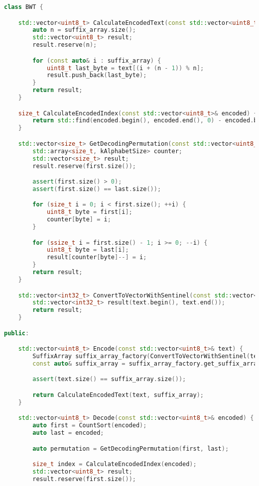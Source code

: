 \begin{lstlisting}[language=C++]
class BWT {

    std::vector<uint8_t> CalculateEncodedText(const std::vector<uint8_t>& text, const std::vector<std::size_t>& suffix_array) {
        auto n = suffix_array.size();
        std::vector<uint8_t> result;
        result.reserve(n);

        for (const auto& i : suffix_array) {
            uint8_t last_byte = text[(i + (n - 1)) % n];
            result.push_back(last_byte);
        }
        return result;
    }

    size_t CalculateEncodedIndex(const std::vector<uint8_t>& encoded) {
        return std::find(encoded.begin(), encoded.end(), 0) - encoded.begin();
    }

    std::vector<size_t> GetDecodingPermutation(const std::vector<uint8_t>& first, const std::vector<uint8_t>& last) {
        std::array<size_t, kAlphabetSize> counter;
        std::vector<size_t> result;
        result.reserve(first.size());

        assert(first.size() > 0);
        assert(first.size() == last.size());

        for (size_t i = 0; i < first.size(); ++i) {
            uint8_t byte = first[i];
            counter[byte] = i;
        }

        for (ssize_t i = first.size() - 1; i >= 0; --i) {
            uint8_t byte = last[i];
            result[counter[byte]--] = i;
        }
        return result;
    }

    std::vector<int32_t> ConvertToVectorWithSentinel(const std::vector<uint8_t>& text) {
        std::vector<int32_t> result(text.begin(), text.end());
        return result;
    }

public:

    std::vector<uint8_t> Encode(const std::vector<uint8_t>& text) {
        SuffixArray suffix_array_factory(ConvertToVectorWithSentinel(text));
        const auto& suffix_array = suffix_array_factory.get_suffix_array();

        assert(text.size() == suffix_array.size());

        return CalculateEncodedText(text, suffix_array);
    }

    std::vector<uint8_t> Decode(const std::vector<uint8_t>& encoded) {
        auto first = CountSort(encoded);
        auto last = encoded;

        auto permutation = GetDecodingPermutation(first, last);

        size_t index = CalculateEncodedIndex(encoded);
        std::vector<uint8_t> result;
        result.reserve(first.size());


\end{lstlisting}

